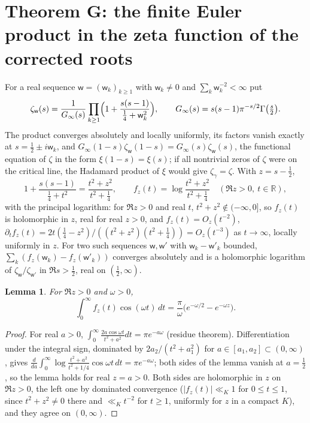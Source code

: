 \documentclass[preprint,12pt]{elsarticle}
\numberwithin{equation}{section}
\theoremstyle{plain}
\newtheorem{lemma}[theorem]{Lemma}
\theoremstyle{definition}
\theoremstyle{remark}
\newcommand{\R}{\mathbb R}
\begin{document}
\section{Theorem G: the finite Euler product in the zeta function of the corrected roots}
\label{sec:euler_product}
For a real sequence $\mathsf w=(\mathsf w_k)_{k\ge1}$ with $\mathsf w_k\ne0$ and $\sum_k\mathsf w_k^{-2}<\infty$ put
\begin{equation}
\zeta_{\mathsf w}(s)=\frac1{G_\infty(s)}\prod_{k\ge1}\Bigl(1+\frac{s(s-1)}{\frac14+\mathsf w_k^2}\Bigr),\qquad G_\infty(s)=s(s-1)\pi^{-s/2}\Gamma\bigl(\tfrac s2\bigr).
\label{eq:zeta_kappa}
\end{equation}
The product converges absolutely and locally uniformly, its factors vanish exactly at $s=\frac12\pm i\mathsf w_k$, and $G_\infty(1-s)\zeta_{\mathsf w}(1-s)=G_\infty(s)\zeta_{\mathsf w}(s)$, the functional equation of $\zeta$ in the form $\xi(1-s)=\xi(s)$; if all nontrivial zeros of $\zeta$ were on the critical line, the Hadamard product of $\xi$ would give $\zeta_\gamma=\zeta$. With $z=s-\frac12$,
\begin{equation}
1+\frac{s(s-1)}{\frac14+t^2}=\frac{t^2+z^2}{t^2+\frac14},\qquad f_z(t)=\log\frac{t^2+z^2}{t^2+\frac14}\quad(\Re z>0,\ t\in\R),
\label{eq:f_z}
\end{equation}
with the principal logarithm: for $\Re z>0$ and real $t$, $t^2+z^2\notin(-\infty,0]$, so $f_z(t)$ is holomorphic in $z$, real for real $z>0$, and $f_z(t)=O_z(t^{-2})$, $\partial_tf_z(t)=2t(\frac14-z^2)/((t^2+z^2)(t^2+\frac14))=O_z(t^{-3})$ as $t\to\infty$, locally uniformly in $z$. For two such sequences $\mathsf w,\mathsf w'$ with $\mathsf w_k-\mathsf w'_k$ bounded, $\sum_k(f_z(\mathsf w_k)-f_z(\mathsf w'_k))$ converges absolutely and is a holomorphic logarithm of $\zeta_{\mathsf w}/\zeta_{\mathsf w'}$ in $\Re s>\frac12$, real on $(\frac12,\infty)$.

\begin{lemma}\label{lem:fourier_log}
For $\Re z>0$ and $\omega>0$,
\[
\int_0^\infty f_z(t)\cos(\omega t)\,dt=\frac\pi\omega\bigl(e^{-\omega/2}-e^{-\omega z}\bigr).
\]
\end{lemma}

\begin{proof}
For real $a>0$, $\int_0^\infty\frac{2a\cos\omega t}{t^2+a^2}dt=\pi e^{-a\omega}$ (residue theorem). Differentiation under the integral sign, dominated by $2a_2/(t^2+a_1^2)$ for $a\in[a_1,a_2]\subset(0,\infty)$, gives $\frac d{da}\int_0^\infty\log\frac{t^2+a^2}{t^2+1/4}\cos\omega t\,dt=\pi e^{-a\omega}$; both sides of the lemma vanish at $a=\frac12$, so the lemma holds for real $z=a>0$. Both sides are holomorphic in $z$ on $\Re z>0$, the left one by dominated convergence ($|f_z(t)|\ll_K1$ for $0\le t\le1$, since $t^2+z^2\ne0$ there and $\ll_Kt^{-2}$ for $t\ge1$, uniformly for $z$ in a compact $K$), and they agree on $(0,\infty)$.
\end{proof}
\end{document}
